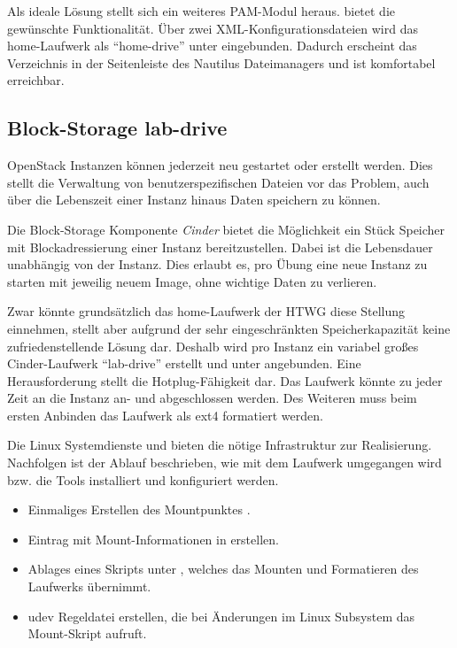 Als ideale Lösung stellt sich ein weiteres PAM-Modul heraus.  bietet die gewünschte Funktionalität. 
Über zwei XML-Konfigurationsdateien wird das home-Laufwerk als \enquote{home-drive} unter  eingebunden.
Dadurch erscheint das Verzeichnis in der Seitenleiste des Nautilus Dateimanagers und ist komfortabel erreichbar.

\subsection{Block-Storage lab-drive}

OpenStack Instanzen können jederzeit neu gestartet oder erstellt werden.
Dies stellt die Verwaltung von benutzerspezifischen Dateien vor das Problem, auch über die Lebenszeit einer Instanz hinaus Daten speichern zu können. 

Die Block-Storage Komponente \emph{Cinder} bietet die Möglichkeit ein Stück Speicher mit Blockadressierung einer Instanz bereitzustellen. 
Dabei ist die Lebensdauer unabhängig von der Instanz. 
Dies erlaubt es, pro Übung eine neue Instanz zu starten mit jeweilig neuem Image, ohne wichtige Daten zu verlieren.

Zwar könnte grundsätzlich das home-Laufwerk der HTWG diese Stellung einnehmen, stellt aber aufgrund der sehr eingeschränkten Speicherkapazität keine zufriedenstellende Lösung dar.
Deshalb wird pro Instanz ein variabel großes Cinder-Laufwerk \enquote{lab-drive} erstellt und unter  angebunden.
Eine Herausforderung stellt die Hotplug-Fähigkeit dar. 
Das Laufwerk könnte zu jeder Zeit an die Instanz an- und abgeschlossen werden.
Des Weiteren muss beim ersten Anbinden das Laufwerk als ext4 formatiert werden.

Die Linux Systemdienste  und  bieten die nötige Infrastruktur zur Realisierung.
Nachfolgen ist der Ablauf beschrieben, wie mit dem Laufwerk umgegangen wird bzw. die Tools installiert und konfiguriert werden.

\begin{itemize}
\item Einmaliges Erstellen des Mountpunktes .
\item Eintrag mit Mount-Informationen in  erstellen.
\item Ablages eines Skripts unter , welches das Mounten und Formatieren des Laufwerks übernimmt.
\item udev Regeldatei erstellen, die bei Änderungen im Linux Subsystem  das Mount-Skript aufruft.
\end{itemize}

